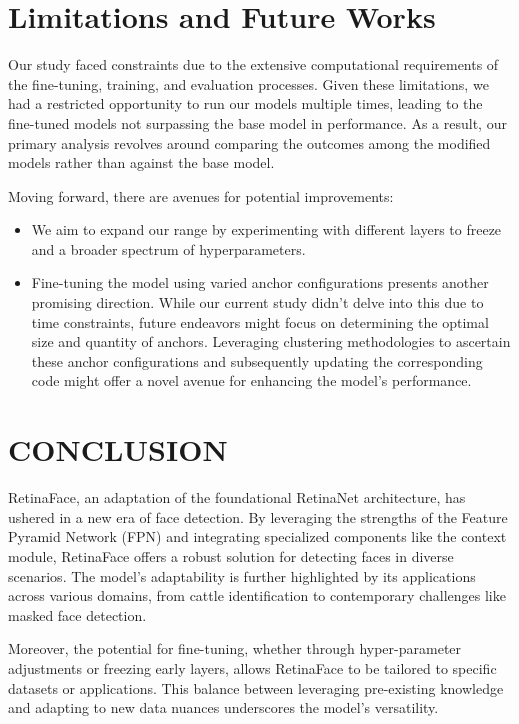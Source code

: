 \documentclass{article}
\begin{document}
\section{Limitations and Future Works}

Our study faced constraints due to the extensive computational requirements of the fine-tuning, training, and evaluation processes. Given these limitations, we had a restricted opportunity to run our models multiple times, leading to the fine-tuned models not surpassing the base model in performance. As a result, our primary analysis revolves around comparing the outcomes among the modified models rather than against the base model.

Moving forward, there are avenues for potential improvements:
\begin{itemize}
    \item We aim to expand our range by experimenting with different layers to freeze and a broader spectrum of hyperparameters.
    \item Fine-tuning the model using varied anchor configurations presents another promising direction. While our current study didn't delve into this due to time constraints, future endeavors might focus on determining the optimal size and quantity of anchors. Leveraging clustering methodologies to ascertain these anchor configurations and subsequently updating the corresponding code might offer a novel avenue for enhancing the model's performance.
\end{itemize}

\section{CONCLUSION}
\label{sec:conclusion}

RetinaFace, an adaptation of the foundational RetinaNet architecture, has ushered in a new era of face detection. By leveraging the strengths of the Feature Pyramid Network (FPN) and integrating specialized components like the context module, RetinaFace offers a robust solution for detecting faces in diverse scenarios. The model's adaptability is further highlighted by its applications across various domains, from cattle identification to contemporary challenges like masked face detection.

Moreover, the potential for fine-tuning, whether through hyper-parameter adjustments or freezing early layers, allows RetinaFace to be tailored to specific datasets or applications. This balance between leveraging pre-existing knowledge and adapting to new data nuances underscores the model's versatility.
\end{document}
